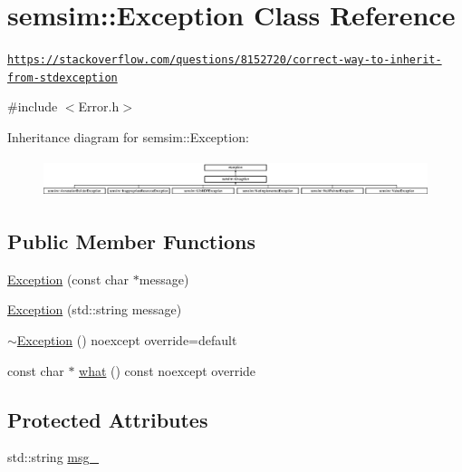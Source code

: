 \hypertarget{classsemsim_1_1Exception}{}\section{semsim\+:\+:Exception Class Reference}
\label{classsemsim_1_1Exception}


\href{https://stackoverflow.com/questions/8152720/correct-way-to-inherit-from-stdexception}{\tt https\+://stackoverflow.\+com/questions/8152720/correct-\/way-\/to-\/inherit-\/from-\/stdexception}  




{\ttfamily \#include $<$Error.\+h$>$}

Inheritance diagram for semsim\+:\+:Exception\+:\begin{figure}[H]
\begin{center}
\leavevmode
\includegraphics[height=1.120000cm]{classsemsim_1_1Exception}
\end{center}
\end{figure}
\subsection*{Public Member Functions}
\begin{DoxyCompactItemize}
\item 
\hyperlink{classsemsim_1_1Exception_ae32b373f579fc88ca9a9b406327f6549}{Exception} (const char $\ast$message)
\item 
\hyperlink{classsemsim_1_1Exception_acd15baba130b34cb81da8ce237406e99}{Exception} (std\+::string message)
\item 
\hyperlink{classsemsim_1_1Exception_a3f2c9347cddce32086f53f360a7839ae}{$\sim$\+Exception} () noexcept override=default
\item 
const char $\ast$ \hyperlink{classsemsim_1_1Exception_a301e9f6c7020ce7218811f4c0683ee77}{what} () const noexcept override
\end{DoxyCompactItemize}
\subsection*{Protected Attributes}
\begin{DoxyCompactItemize}
\item 
std\+::string \hyperlink{classsemsim_1_1Exception_a536284719db9cd57b8762e6e5a5a8820}{msg\+\_\+}
\end{DoxyCompactItemize}


